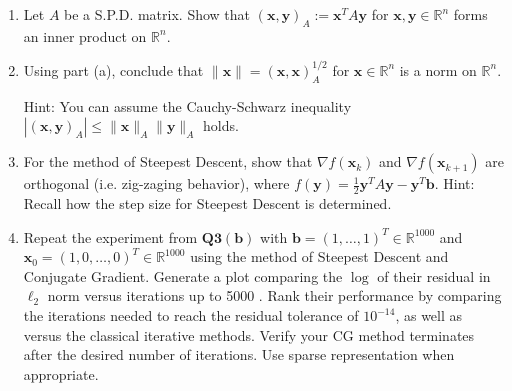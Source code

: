 \documentclass{report}
\begin{document}
{
	\begin{enumerate}[label=(\alph*)]
		\item Let $A$ be a S.P.D. matrix. Show that $(\boldsymbol{x}, \boldsymbol{y})_A:=\boldsymbol{x}^T A \boldsymbol{y}$ for $\boldsymbol{x}, \boldsymbol{y} \in \mathbb{R}^n$ forms an inner product on $\mathbb{R}^n$.
		\item Using part (a), conclude that $\|\boldsymbol{x}\|=(\boldsymbol{x}, \boldsymbol{x})_A^{1 / 2}$ for $\boldsymbol{x} \in \mathbb{R}^n$ is a norm on $\mathbb{R}^n$.

		      Hint: You can assume the Cauchy-Schwarz inequality $\left|(\boldsymbol{x}, \boldsymbol{y})_A\right| \leq\|\boldsymbol{x}\|_A\|\boldsymbol{y}\|_A$ holds.
		\item For the method of Steepest Descent, show that $\nabla f\left(\boldsymbol{x}_k\right)$ and $\nabla f\left(\boldsymbol{x}_{k+1}\right)$ are orthogonal (i.e. zig-zaging behavior), where $f(\boldsymbol{y})=\frac{1}{2} \boldsymbol{y}^T A \boldsymbol{y}-\boldsymbol{y}^T \boldsymbol{b}$. Hint: Recall how the step size for Steepest Descent is determined.
		\item Repeat the experiment from $\mathbf{Q 3}(\mathbf{b})$ with $\boldsymbol{b}=(1, \ldots, 1)^T \in \mathbb{R}^{1000}$ and $\boldsymbol{x}_0=(1,0, \ldots, 0)^T \in \mathbb{R}^{1000}$ using the method of Steepest Descent and Conjugate Gradient. Generate a plot comparing the $\log$ of their residual in $\ell_2$ norm versus iterations up to 5000 . Rank their performance by comparing the iterations needed to reach the residual tolerance of $10^{-14}$, as well as versus the classical iterative methods. Verify your CG method terminates after the desired number of iterations. Use sparse representation when appropriate.
	\end{enumerate}
}
\end{document}
